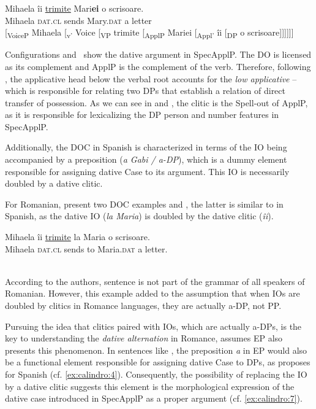 \documentclass[output=paper,colorlinks,citecolor=brown]{./langscibook}
\begin{document}
\ea%
    \label{ex:calindro:5}
    \ea\label{ex:calindro:5a}
    \gll Mihaela  {îi}             \underline{trimite}   {Mari}\textbf{{ei}        } o scrisoare. \\
    Mihaela  \textsc{dat.cl}  sends   Mary.\textsc{dat}  a letter \\
    \ex\label{ex:calindro:5b} [\textsubscript{VoiceP} Mihaela [{\textsubscript{v’}} Voice [\textsubscript{VP} trimite [\textsubscript{ApplP} Mariei [\textsubscript{Appl’} îi [\textsubscript{DP} o scrisoare]]]]]] \hfill \citep[2]{DiaconescuRivero2007}
    \z
\z

Configurations  and ~show the dative argument in SpecApplP. The DO is licensed as its complement and ApplP is the complement of the verb. Therefore, following \citet{Pylkkänen2002}, the applicative head below the verbal root accounts for the \textit{low applicative} – which is responsible for relating two DPs that establish a relation of direct transfer of possession. As we can see in  and , the clitic is the Spell-out of ApplP, as it is responsible for lexicalizing the DP person and number features in SpecApplP. 

Additionally, the DOC in Spanish is characterized in terms of the IO being accompanied by a preposition (\textit{a Gabi / a-DP}), which is a dummy element responsible for assigning dative Case to its argument. This IO is necessarily doubled by a dative clitic. 

For Romanian, \citet{DiaconescuRivero2007} present two DOC examples  and , the latter is similar to  in Spanish, as the dative IO (\textit{la Maria}) is doubled by the dative clitic (\textit{îi}).

\ea%
    \label{ex:calindro:6}
    \gll Mihaela {îi}    \underline{trimite}   {la} {Maria}    o scrisoare.\\
    Mihaela \textsc{dat.cl}  sends     to Maria.\textsc{dat}  a letter.\\
    \glt ~\hfill \citep[14]{DiaconescuRivero2007}
    \z

According to the authors, sentence  is not part of the grammar of all speakers of Romanian. However, this example added to the assumption that when IOs are doubled by clitics in Romance languages, they are actually a-DP, not PP. 

Pursuing the idea that clitics paired with IOs, which are actually a-DPs, is the key to understanding the \textit{dative alternation} in Romance, \citet{TorresMorais2007} assumes EP also presents this phenomenon. In sentences like , the preposition \textit{a} in EP would also be a functional element responsible for assigning dative Case to DPs, as \citet{Cuervo2003} proposes for Spanish (cf. \ref{ex:calindro:4}). Consequently, the possibility of replacing the IO by a dative clitic suggests this element is the morphological expression of the dative case introduced in SpecApplP as a proper argument (cf. \ref{ex:calindro:7}). 
\end{document}
